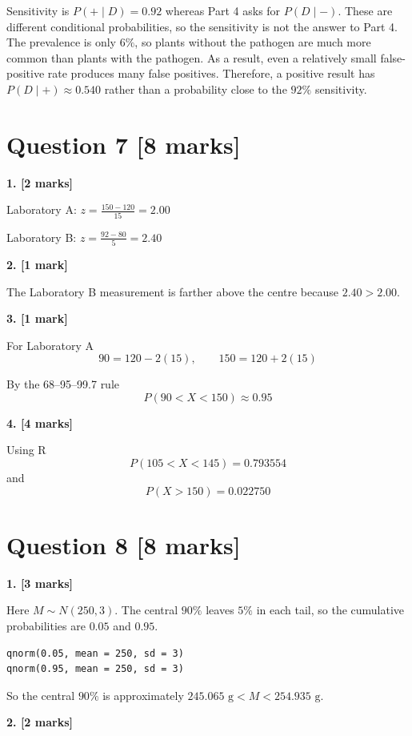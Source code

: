 \documentclass[10pt,letterpaper]{article}
\begin{document}
Sensitivity is $P(+\mid D)=0.92$ whereas Part 4 asks for $P(D\mid -)$. These are different conditional probabilities, so the sensitivity is not the answer to Part 4. The prevalence is only \(6\%\), so plants without the pathogen are much more common than plants with the pathogen. As a result, even a relatively small false-positive rate produces many false positives. Therefore, a positive result has $P(D\mid +)\approx0.540$ rather than a probability close to the \(92\%\) sensitivity.


\section*{Question 7 \hfill [8 marks]}

\textbf{1. [2 marks]}

Laboratory A: $z=\frac{150-120}{15}=\boxed{2.00}$

Laboratory B: $z=\frac{92-80}{5}=\boxed{2.40}$

\textbf{2. [1 mark]}

The Laboratory B measurement is farther above the centre because $\boxed{2.40>2.00}$.

\textbf{3. [1 mark]}

For Laboratory A
$$90=120-2(15),\qquad150=120+2(15)$$

By the 68--95--99.7 rule
$$\boxed{P(90<X<150)\approx0.95}$$

\textbf{4. [4 marks]}

Using R
$$P(105<X<145)=\boxed{0.793554}$$
and
$$P(X>150)=\boxed{0.022750}$$


\section*{Question 8 \hfill [8 marks]}

\textbf{1. [3 marks]}

Here $M\sim N(250,3)$. The central \(90\%\) leaves \(5\%\) in each tail, so the cumulative probabilities are \(0.05\) and \(0.95\).
\begin{lstlisting}
qnorm(0.05, mean = 250, sd = 3)
qnorm(0.95, mean = 250, sd = 3)
\end{lstlisting}
So the central \(90\%\) is approximately $\boxed{245.065\text{ g}<M<254.935\text{ g}}$.

\textbf{2. [2 marks]}
\end{document}
